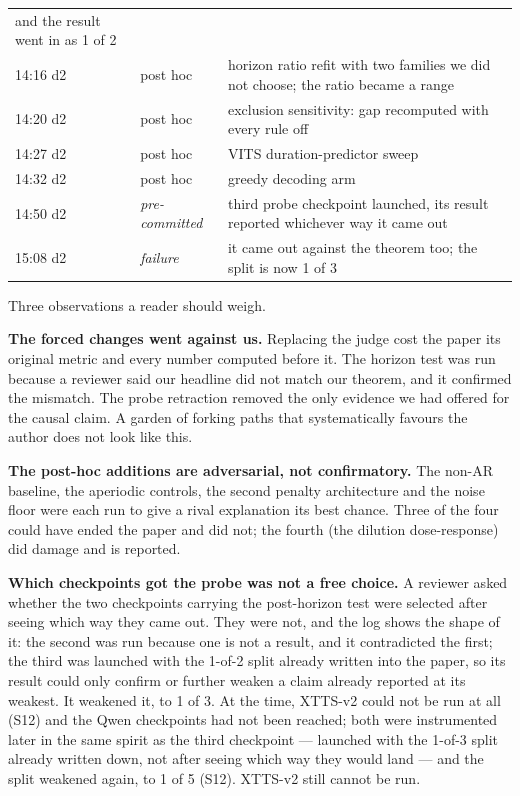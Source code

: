 \documentclass[11pt]{article}
\begin{document}
\begin{longtable}{llp{4.6cm}}
  and the result went in as 1 of 2 \\
14:16 d2 & post hoc & horizon ratio refit with two families we did not choose;
  the ratio became a range \\
14:20 d2 & post hoc & exclusion sensitivity: gap recomputed with every rule off \\
14:27 d2 & post hoc & VITS duration-predictor sweep \\
14:32 d2 & post hoc & greedy decoding arm \\
14:50 d2 & \emph{pre-committed} & third probe checkpoint launched, its result
  reported whichever way it came out \\
15:08 d2 & \emph{failure} & it came out against the theorem too; the split is
  now 1 of 3 \\
\bottomrule
\end{longtable}

Three observations a reader should weigh.

\noindent\textbf{The forced changes went against us.} Replacing the judge cost
the paper its original metric and every number computed before it. The horizon
test was run because a reviewer said our headline did not match our theorem, and
it confirmed the mismatch. The probe retraction removed the only evidence we had
offered for the causal claim. A garden of forking paths that systematically
favours the author does not look like this.

\noindent\textbf{The post-hoc additions are adversarial, not confirmatory.} The
non-AR baseline, the aperiodic controls, the second penalty architecture and the
noise floor were each run to give a rival explanation its best chance. Three of
the four could have ended the paper and did not; the fourth (the dilution
dose-response) did damage and is reported.

\noindent\textbf{Which checkpoints got the probe was not a free choice.} A
reviewer asked whether the two checkpoints carrying the post-horizon test were
selected after seeing which way they came out. They were not, and the log shows
the shape of it: the second was run because one is not a result, and it
contradicted the first; the third was launched with the 1-of-2 split already
written into the paper, so its result could only confirm or further weaken a
claim already reported at its weakest. It weakened it, to 1 of 3. At the time,
XTTS-v2 could not be run at all (S12) and the Qwen checkpoints had not been
reached; both were instrumented later in the same spirit as the third
checkpoint --- launched with the 1-of-3 split already written down, not after
seeing which way they would land --- and the split weakened again, to 1 of 5
(S12). XTTS-v2 still cannot be run.
\end{document}
